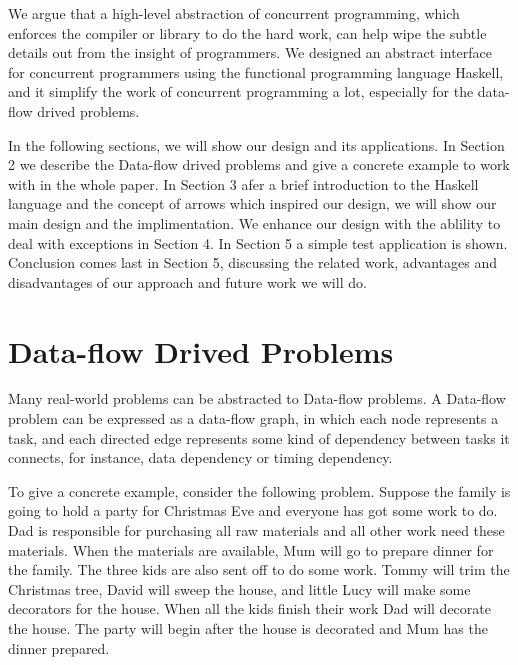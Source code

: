 \documentclass[conference]{IEEEtran}
\begin{document}
We argue that a high-level abstraction of concurrent programming, which enforces the compiler
or library to do the hard work, can help wipe the subtle details out from the insight
of programmers. We designed an abstract interface for concurrent programmers
using the functional programming language Haskell,
and it simplify the work of concurrent programming a lot, especially for the data-flow
drived problems.

In the following sections, we will show our design and its applications. In Section 2 we
describe the Data-flow drived problems and give a concrete example to work with in the
whole paper. In Section 3  afer a brief introduction to the Haskell language and
the concept of arrows which inspired our design, we will show our main design and
the implimentation. We enhance our design
with the ablility to deal with exceptions in Section 4. In Section 5 a simple test
application is shown. Conclusion comes last in Section 5, discussing the related work, advantages
and disadvantages of our approach and future work we will do.

\section{Data-flow Drived Problems}\label{sec:dataflow-drived-problems}
Many real-world problems can be abstracted to Data-flow problems. A Data-flow problem
can be expressed as a data-flow graph, in which each node represents a task, and each
directed edge represents some kind of dependency between tasks it connects, for instance,
data dependency or timing dependency.

To give a concrete example, consider the following problem. Suppose the family is going to hold
a party for Christmas Eve and everyone has got some work to do. Dad is responsible for
purchasing all raw materials and all other work need these materials. When the materials
are available, Mum will go to prepare dinner for the family. The three kids are also sent off
to do some work. Tommy will trim the Christmas tree, David will sweep the house, and little Lucy
will make some decorators for the house. When all the kids finish their work Dad will decorate the
house. The party will begin after the house is decorated and Mum has the
dinner prepared.
\end{document}
